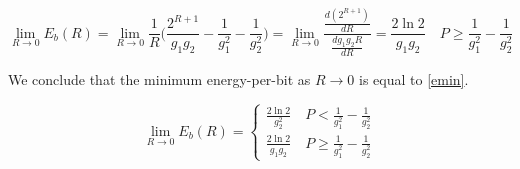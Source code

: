 \begin{equation}
		\lim_{R \rightarrow 0} E_b(R) =
		\lim_{R \rightarrow 0} \frac{1}{R} \Big(\frac{2^{R+1}}{g_1g_2} -\frac{1}{g_1^2} - \frac{1}{g_2^2} \Big) = \lim_{R \rightarrow 0} \frac{ \frac{d(2^{R+1})}{dR}} {\frac{dg_1g_2 R}{dR}}=\frac{2\ln{2}}{g_1g_2}  \quad P \geq \frac{1}{g_1^2} - \frac{1}{g_2^2}
\end{equation}

We conclude that the minimum energy-per-bit as $R \rightarrow 0$ is equal to \eqref{emin}.

\begin{equation}
	\lim_{R \rightarrow 0} E_b(R) = \begin{cases}
		\frac{2\ln{2}}{g_2^2} \quad P < \frac{1}{g_1^2} - \frac{1}{g_2^2} \\
		\frac{2\ln{2}}{g_1g_2} \quad P \geq \frac{1}{g_1^2} - \frac{1}{g_2^2}
\end{cases}
\label{emin}
\end{equation}

